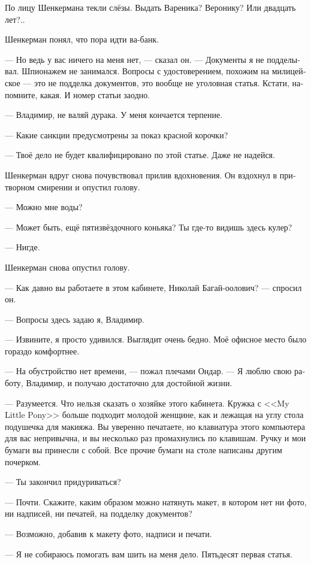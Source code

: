 \documentclass[a5paper,12pt,fleqn]{extbook}\usepackage{cooltooltips}\usepackage{polyglossia}\setdefaultlanguage[babelshorthands=true]{russian}\setotherlanguage{english}\defaultfontfeatures{Ligatures=TeX,Mapping=tex-text} \usepackage{xcolor}\definecolor{lightgray}{HTML}{bbbbbb}\color{lightgray}\newcommand{\ml}[3]{\textenglish{\textcolor{black}{#3}}}
\begin{document}
По лицу Шенкермана текли слёзы.
Выдать Вареника?
Веронику?
Или двадцать лет?..

Шенкерман понял, что пора идти ва-банк.

--- Но ведь у вас ничего на меня нет, --- сказал он.
--- Документы я не подделывал.
Шпионажем не занимался.
Вопросы с удостоверением, похожим на милицейское --- это не подделка документов, это вообще не уголовная статья.
Кстати, напомните, какая.
И номер статьи заодно.

--- Владимир, не валяй дурака.
У меня кончается терпение.

--- Какие санкции предусмотрены за показ красной корочки?

--- Твоё дело не будет квалифицировано по этой статье.
Даже не надейся.

Шенкерман вдруг снова почувствовал прилив вдохновения.
Он вздохнул в притворном смирении и опустил голову.

--- Можно мне воды?

--- Может быть, ещё пятизвёздочного коньяка?
Ты где-то видишь здесь кулер?

--- Нигде.

Шенкерман снова опустил голову.

--- Как давно вы работаете в этом кабинете, Николай Багай-оолович? --- спросил он.

--- Вопросы здесь задаю я, Владимир.

--- Извините, я просто удивился.
Выглядит очень бедно.
Моё офисное место было гораздо комфортнее.

--- На обустройство нет времени, --- пожал плечами Ондар.
--- Я люблю свою работу, Владимир, и получаю достаточно для достойной жизни.

--- Разумеется.
Что нельзя сказать о хозяйке этого кабинета.
Кружка с <<My Little Pony>> больше подходит молодой женщине, как и лежащая на углу стола подушечка для макияжа.
Вы уверенно печатаете, но клавиатура этого компьютера для вас непривычна, и вы несколько раз промахнулись по клавишам.
Ручку и мои бумаги вы принесли с собой.
Все прочие бумаги на столе написаны другим почерком.

--- Ты закончил придуриваться?

--- Почти.
Скажите, каким образом можно натянуть макет, в котором нет ни фото, ни надписей, ни печатей, на подделку документов?

--- Возможно, добавив к макету фото, надписи и печати.

--- Я не собираюсь помогать вам шить на меня дело.
Пятьдесят первая статья.
\end{document}
